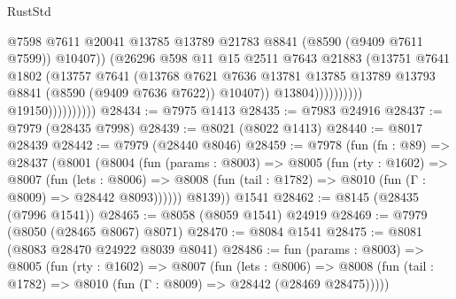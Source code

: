\begin{lexlean}{RustStd}
\begin{coremodule}
                                            @7598
                                            @7611
                                            @20041
                                            @13785
                                            @13789
                                            @21783
                                            @8841
                                            (@8590 (@9409 @7611 @7599))
                                            @10407))
                                        (@26296
                                          @598
                                          @11
                                          @15
                                          @2511
                                          @7643
                                          @21883
                                          (@13751
                                            @7641
                                            @1802
                                            (@13757
                                              @7641
                                              (@13768
                                                @7621
                                                @7636
                                                @13781
                                                @13785
                                                @13789
                                                @13793
                                                @8841
                                                (@8590 (@9409 @7636 @7622))
                                                @10407))
                                            @13804))))))))))
                        @19150))))))))))
@28434 := @7975 @1413
@28435 := @7983 @24916
@28437 := @7979 (@28435 @7998)
@28439 := @8021 (@8022 @1413)
@28440 := @8017 @28439
@28442 := @7979 (@28440 @8046)
@28459 := @7978
    (fun (fn : @89) =>
    @28437
      (@8001
        (@8004
          (fun (params : @8003) =>
          @8005
            (fun (rty : @1602) =>
            @8007
              (fun (lets : @8006) =>
              @8008 (fun (tail : @1782) => @8010 (fun (Γ : @8009) => @28442 @8093))))))
        @8139))
    @1541
@28462 := @8145 (@28435 (@7996 @1541))
@28465 := @8058 (@8059 @1541) @24919
@28469 := @7979 (@8050 (@28465 @8067) @8071)
@28470 := @8084 @1541
@28475 := @8081 (@8083 @28470 @24922 @8039 @8041)
@28486 := fun (params : @8003) =>
  @8005
    (fun (rty : @1602) =>
    @8007
      (fun (lets : @8006) =>
      @8008 (fun (tail : @1782) => @8010 (fun (Γ : @8009) => @28442 (@28469 @28475)))))

\end{coremodule}
\end{lexlean}
